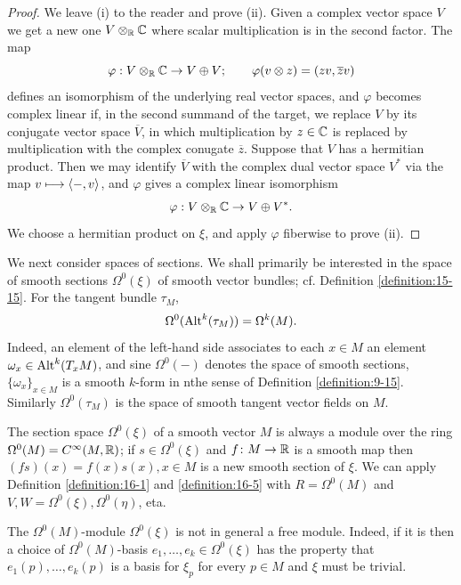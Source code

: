 \begin{proof}
  We leave (i) to the reader and prove (ii). Given a complex vector space $V$ we get a new 
  one $V\otr[\RR]\CC$ where scalar multiplication is in the second factor. The map
  \[
    \varphi:V\otr[\RR]\CC\to V\oplus V;\qquad 
    \varphi(v\otimes z) = (zv, \overline{z}v)
  \]
  defines an isomorphism of the underlying real vector spaces, and $\varphi$ becomes
  complex linear if, in the second summand of the target, we replace $V$ by its
  conjugate vector space $\overline{V}$, in which multiplication by $z\in\CC$ is replaced by
  multiplication with the complex conugate $\overline{z}$. Suppose that $V$ has a hermitian
  product. Then we may identify $\overline{V}$ with the complex dual vector space $V^*$ via the
  map $v\ma \langle -, v\rangle$, and $\varphi$ gives a complex linear isomorphism
  \[
    \varphi:V\otr[\RR]\CC \to V\oplus V^*.
  \]
  We choose a hermitian product on $\xi$, and apply $\varphi$ fiberwise to prove (ii).
\end{proof}

We next consider spaces of sections. We shall primarily be interested in the space
of smooth sections $\Omega^0(\xi)$ of smooth vector bundles; cf. Definition \ref{definition:15-15}. 
For the tangent bundle $\tau_M$,
\begin{align}\label{eq:16-12}
  \Omega^0(\alt^k(\tau_M)) = \Omega^k(M).
\end{align}
Indeed, an element of the left-hand side associates to each $x\in M$ an element $\omega_x\in \alt^k(T_xM)$, 
and sine $\Omega^0(-)$ denotes the space of smooth sections, $\{\omega_x\}_{x\in M}$ is a smooth $k$-form in nthe sense of 
Definition \ref{definition:9-15}. Similarly $\Omega^0(\tau_M)$ is the space of smooth tangent vector fields on $M$.

The section space $\Omega^0(\xi)$ of a smooth vector $M$ is always a module over the ring $\Omega^0(M)=C^\infty(M, \RR)$;
if $s\in\Omega^0(\xi)$ and $f\colon M\to\RR$ is a smooth map then $(fs)(x)=f(x)s(x), x\in M$ is a new smooth section of $\xi$. We can 
apply Definition \ref{definition:16-1} and \ref{definition:16-5} with $R = \Omega^0(M)$ and $V, W=\Omega^0(\xi), \Omega^0(\eta)$, eta.

The $\Omega^0(M)$-module $\Omega^0(\xi)$ is not in general a free module. Indeed, if it is then a choice of $\Omega^0(M)$-basis
$e_1, \ldots, e_k\in \Omega^0(\xi)$ has the property that $e_1(p), \ldots, e_k(p)$ is a basis for $\xi_p$ for every $p\in M$ and $\xi$
must be trivial.


